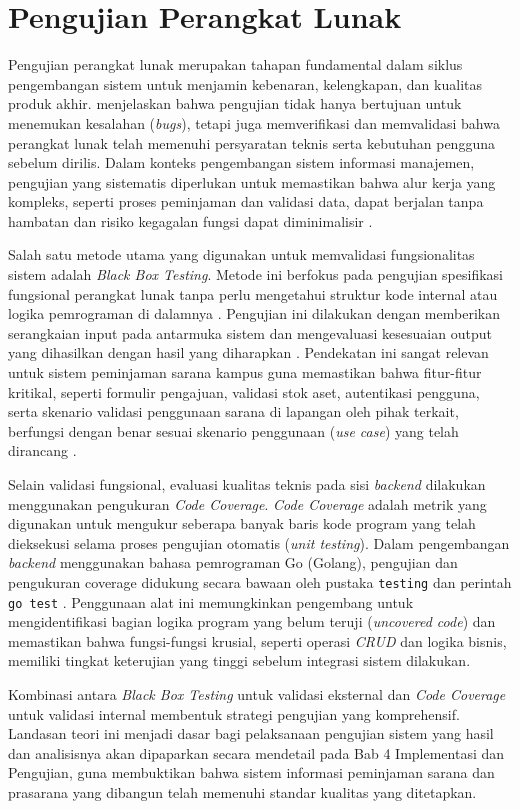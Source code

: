 \section{Pengujian Perangkat Lunak}
Pengujian perangkat lunak merupakan tahapan fundamental dalam siklus pengembangan sistem untuk menjamin kebenaran, kelengkapan, dan kualitas produk akhir. \textcite{taley2020comprehensive} menjelaskan bahwa pengujian tidak hanya bertujuan untuk menemukan kesalahan (\textit{bugs}), tetapi juga memverifikasi dan memvalidasi bahwa perangkat lunak telah memenuhi persyaratan teknis serta kebutuhan pengguna sebelum dirilis. Dalam konteks pengembangan sistem informasi manajemen, pengujian yang sistematis diperlukan untuk memastikan bahwa alur kerja yang kompleks, seperti proses peminjaman dan validasi data, dapat berjalan tanpa hambatan dan risiko kegagalan fungsi dapat diminimalisir \parencite{Suwirmayanti2020}.

Salah satu metode utama yang digunakan untuk memvalidasi fungsionalitas sistem adalah \textit{Black Box Testing}. Metode ini berfokus pada pengujian spesifikasi fungsional perangkat lunak tanpa perlu mengetahui struktur kode internal atau logika pemrograman di dalamnya \parencite{Suwirmayanti2020}. Pengujian ini dilakukan dengan memberikan serangkaian input pada antarmuka sistem dan mengevaluasi kesesuaian output yang dihasilkan dengan hasil yang diharapkan \parencite{PutriNabella2025}. Pendekatan ini sangat relevan untuk sistem peminjaman sarana kampus guna memastikan bahwa fitur-fitur kritikal, seperti formulir pengajuan, validasi stok aset, autentikasi pengguna, serta skenario validasi penggunaan sarana di lapangan oleh pihak terkait, berfungsi dengan benar sesuai skenario penggunaan (\textit{use case}) yang telah dirancang \parencite{Purwati2022}.

Selain validasi fungsional, evaluasi kualitas teknis pada sisi \textit{backend} dilakukan menggunakan pengukuran \textit{Code Coverage}. \textit{Code Coverage} adalah metrik yang digunakan untuk mengukur seberapa banyak baris kode program yang telah dieksekusi selama proses pengujian otomatis (\textit{unit testing}). Dalam pengembangan \textit{backend} menggunakan bahasa pemrograman Go (Golang), pengujian dan pengukuran coverage didukung secara bawaan oleh pustaka \texttt{testing} dan perintah \texttt{go test} \parencite{kommadi2019learn}. Penggunaan alat ini memungkinkan pengembang untuk mengidentifikasi bagian logika program yang belum teruji (\textit{uncovered code}) dan memastikan bahwa fungsi-fungsi krusial, seperti operasi \textit{CRUD} dan logika bisnis, memiliki tingkat keterujian yang tinggi sebelum integrasi sistem dilakukan.

Kombinasi antara \textit{Black Box Testing} untuk validasi eksternal dan \textit{Code Coverage} untuk validasi internal membentuk strategi pengujian yang komprehensif. Landasan teori ini menjadi dasar bagi pelaksanaan pengujian sistem yang hasil dan analisisnya akan dipaparkan secara mendetail pada Bab 4 Implementasi dan Pengujian, guna membuktikan bahwa sistem informasi peminjaman sarana dan prasarana yang dibangun telah memenuhi standar kualitas yang ditetapkan.

